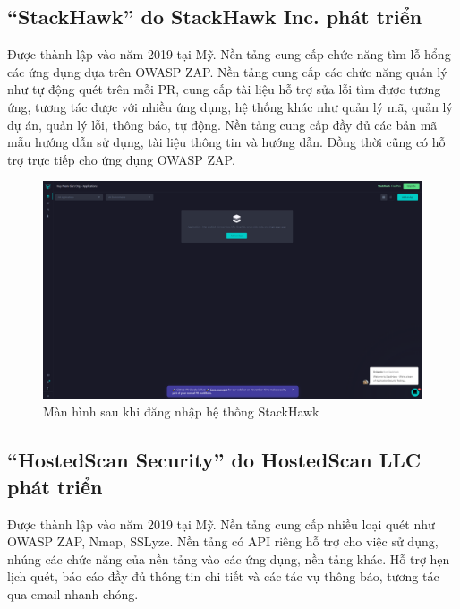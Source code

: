 \subsection{“StackHawk” do StackHawk Inc. phát triển}

\tab Được thành lập vào năm 2019 tại Mỹ.
Nền tảng cung cấp chức năng tìm lỗ hổng các ứng dụng dựa trên OWASP ZAP.
Nền tảng cung cấp các chức năng quản lý như tự động quét trên mỗi PR, cung cấp tài liệu hỗ trợ sửa lỗi tìm được tương ứng, tương tác được với nhiều ứng dụng, hệ thống khác như quản lý mã, quản lý dự án, quản lý lỗi, thông báo, tự động.
Nền tảng cung cấp đầy đủ các bản mã mẫu hướng dẫn sử dụng, tài liệu thông tin và hướng dẫn.
Đồng thời cũng có hỗ trợ trực tiếp cho ứng dụng OWASP ZAP.

\begin{figure}[H]
    \centering
    \includegraphics[width=\textwidth]{applied-thesis-chapters/chapter-1/app.stackhawk.com_applications.png}
    \caption{Màn hình sau khi đăng nhập hệ thống StackHawk}
\end{figure}

\subsection{“HostedScan Security” do HostedScan LLC phát triển}

\tab Được thành lập vào năm 2019 tại Mỹ.
Nền tảng cung cấp nhiều loại quét như OWASP ZAP, Nmap, SSLyze.
Nền tảng có API riêng hỗ trợ cho việc sử dụng, nhúng các chức năng của nền tảng vào các ứng dụng, nền tảng khác.
Hỗ trợ hẹn lịch quét, báo cáo đầy đủ thông tin chi tiết và các tác vụ thông báo, tương tác qua email nhanh chóng.

